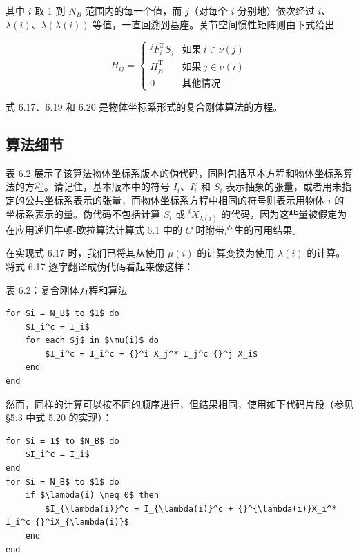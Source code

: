 \documentclass[10pt,a4paper]{book}
\theoremstyle{thmstyle} %
\theoremstyle{defstyle} %
\theoremstyle{prostyle} %
\begin{document}
其中 $i$ 取 1 到 $N_{B}$ 范围内的每一个值，而 $j$（对每个 $i$ 分别地）依次经过 $i$、$\lambda(i)$、$\lambda(\lambda(i))$ 等值，一直回溯到基座。关节空间惯性矩阵则由下式给出



$$
H _ { i j } = \left\{ \begin{array}{ll} { ^ j F _ { i } ^{\mathrm { T} } S _ { j } } & { \text{如果}~ i \in \nu ( j ) } \\{ H _ { j i } ^{\mathrm { T} } } & { \text{如果}~ j \in \nu ( i ) } \\{ 0 } & \text{其他情况} . \end{array} \right.
$$



式 6.17、6.19 和 6.20 是物体坐标系形式的复合刚体算法的方程。



\subsection{算法细节}





表 6.2 展示了该算法物体坐标系版本的伪代码，同时包括基本方程和物体坐标系算法的方程。请记住，基本版本中的符号 $I_{i}$、$I_{i}^{\mathrm{c}}$ 和 $S_{i}$ 表示抽象的张量，或者用未指定的公共坐标系表示的张量，而物体坐标系方程中相同的符号则表示用物体 $i$ 的坐标系表示的量。伪代码不包括计算 $S_{i}$ 或 ${}^{i}X_{\lambda(i)}$ 的代码，因为这些量被假定为在应用递归牛顿-欧拉算法计算式 6.1 中的 $C$ 时附带产生的可用结果。



在实现式 6.17 时，我们已将其从使用 $\mu(i)$ 的计算变换为使用 $\lambda(i)$ 的计算。将式 6.17 逐字翻译成伪代码看起来像这样：



表 6.2：复合刚体方程和算法





\begin{verbatim}
for $i = N_B$ to $1$ do
    $I_i^c = I_i$
    for each $j$ in $\mu(i)$ do
        $I_i^c = I_i^c + {}^i X_j^* I_j^c {}^j X_i$
    end
end
\end{verbatim}


然而，同样的计算可以按不同的顺序进行，但结果相同，使用如下代码片段（参见 §5.3 中式 5.20 的实现）：



\begin{verbatim}
for $i = 1$ to $N_B$ do
    $I_i^c = I_i$
end
for $i = N_B$ to $1$ do
    if $\lambda(i) \neq 0$ then
        $I_{\lambda(i)}^c = I_{\lambda(i)}^c + {}^{\lambda(i)}X_i^* I_i^c {}^iX_{\lambda(i)}$
    end
end
\end{verbatim}
\end{document}
